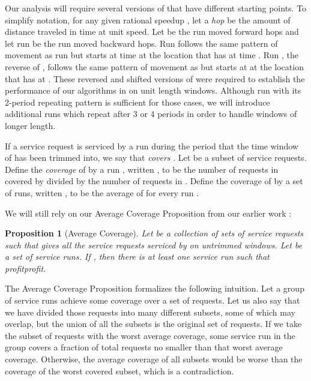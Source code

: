 \documentclass[11pt]{article}
\newtheorem{proposition}{Proposition}[section]
\begin{document}
Our analysis will require several versions of  that have different starting points.  To simplify notation, for any given rational speedup , let a {\em hop} be the amount of distance traveled in  time at unit speed.  Let  be the run  moved forward  hops and let run  be the run  moved backward  hops. Run  follows the same pattern of movement as run  but starts at time  at the location that  has at  time .  Run , the reverse of , follows the same pattern of movement as  but starts at  at the location that  has at .  These reversed and shifted versions of  were required to establish the performance of our algorithms in \cite{Frederickson5} on unit length windows.  Although run  with its 2-period repeating pattern is sufficient for those cases, we will introduce additional runs which repeat after 3 or 4 periods in order to handle windows of longer length.

If a service request  is serviced by a run  during the period that the time window of  has been trimmed into, we say that  {\em covers} .
Let  be a subset of service requests.  Define the {\em coverage} of  by a run , written , to be the number of requests in  covered by  divided by the number of requests in .  Define the coverage of  by a set  of runs, written , to be the average of  for every run .

We will still rely on our Average Coverage Proposition from our earlier work \cite{Frederickson5}:

\begin{proposition}[Average Coverage] \label{proposition:averaging}  Let  be a collection of sets of service requests such that  gives all the service requests serviced by  on untrimmed windows.  Let  be a set of service runs.  If , then there is at least one service run  such that profitprofit.
\end{proposition}

The Average Coverage Proposition formalizes the following intuition.  Let a group of service runs achieve some coverage over a set of requests.  Let us also say that we have divided those requests into many different subsets, some of which may overlap, but the union of all the subsets is the original set of requests.  If we take the subset of requests with the worst average coverage, some service run in the group covers a fraction of total requests no smaller than that worst average coverage.  Otherwise, the average coverage of all subsets would be worse than the coverage of the worst covered subset, which is a contradiction.
\end{document}
